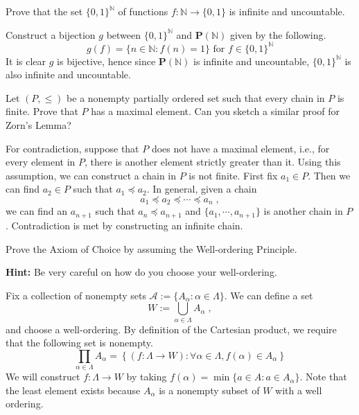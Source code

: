 \documentclass[../main.tex]{subfiles}
\begin{document}
\begin{problem}[3]
Prove that the set $\{ 0, 1 \}^{\mathbb{N}}$ of functions $f : \mathbb{N} \to \{ 0, 1 \}$ is infinite and uncountable.
\end{problem}
Construct a bijection $g$ between $\{ 0, 1 \}^{\mathbb{N}}$ and $\mathbf{P}(\mathbb{N})$ given by the following.
\[
	g(f) = \{ n \in \mathbb{N} : f(n) = 1 \} \text{ for } f \in \{ 0, 1 \}^{\mathbb{N}}
\]
It is clear $g$ is bijective, hence since $\mathbf{P}(\mathbb{N})$ is infinite and uncountable, $\{ 0, 1 \}^{\mathbb{N}}$ is also infinite and uncountable.

\begin{problem}[5]
Let $(P, \le)$ be a nonempty partially ordered set such that every chain in $P$ is finite.
Prove that $P$ has a maximal element.
Can you sketch a similar proof for Zorn's Lemma?
\end{problem}
For contradiction, suppose that $P$ does not have a maximal element, i.e., for every element in $P$, there is another element strictly greater than it.
Using this assumption, we can construct a chain in $P$ is not finite.
First fix $a_1 \in P$.
Then we can find $a_2 \in P$ such that $a_1 \preceq a_2$.
In general, given a chain
\[
	a_1 \preceq a_2 \preceq \cdots \preceq a_n \; ,
\]
we can find an $a_{n + 1}$ such that $a_n \preceq a_{n + 1}$ and $\{ a_1, \cdots ,a_{n + 1} \}$ is another chain in $P$.
Contradiction is met by constructing an infinite chain.

\begin{problem}[6]
Prove the Axiom of Choice by assuming the Well-ordering Principle.

\textbf{Hint:} Be very careful on how do you choose your well-ordering.
\end{problem}
Fix a collection of nonempty sets $\mathcal{A} := \{ A_\alpha : \alpha \in \Lambda \}$.
We can define a set
\[
	W := \bigcup_{\alpha \in \Lambda} A_\alpha \; ,
\]
and choose a well-ordering.
By definition of the Cartesian product, we require that the following set is nonempty.
\[
	\prod_{\alpha \in \Lambda} A_\alpha = \left\{ \left( f : \Lambda \to W \right) : \forall \alpha \in \Lambda, f(\alpha) \in A_\alpha \right\}
\]
We will construct $f : \Lambda \to W $ by taking $f(\alpha) = \min\{ a \in A : a \in A_\alpha \}$.
Note that the least element exists because $A_\alpha$ is a nonempty subset of $W$ with a well ordering.
\end{document}
